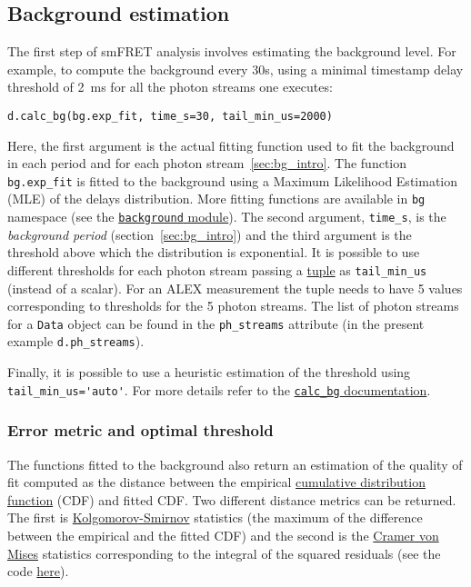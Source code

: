 \subsection{Background estimation}
\label{sec:bg_calc}

The first step of smFRET analysis involves estimating the background level. 
For example, to compute the background every 30s, using a minimal timestamp 
delay threshold of 2~ms for all the photon streams one executes: 

\begin{verbatim}
d.calc_bg(bg.exp_fit, time_s=30, tail_min_us=2000)
\end{verbatim}

Here, the first argument is the actual fitting function used to fit the
background in each period and for each photon stream~\ref{sec:bg_intro}. The function 
\verb|bg.exp_fit| is fitted to the background using a Maximum Likelihood Estimation 
(MLE) of the delays distribution. More fitting functions are available in 
\verb|bg| namespace (see the 
\href{http://fretbursts.readthedocs.org/en/latest/background.html}
{\texttt{background} module}). The second argument, \verb|time_s|, is the 
\textit{background period} (section~\ref{sec:bg_intro}) and the third argument 
is the threshold above which the distribution is exponential. 
It is possible to use different thresholds 
for each photon stream passing a 
\href{https://docs.python.org/2/tutorial/datastructures.html#tuples-and-sequences}{tuple} 
as \verb|tail_min_us| (instead of a scalar). 
For an ALEX measurement the tuple needs to have 5 values 
corresponding to thresholds for the 5 photon streams. The list of photon 
streams for a \verb|Data| object can be found in the \verb|ph_streams| 
attribute (in the present example \verb|d.ph_streams|). 

Finally, it is possible to use a heuristic estimation of the threshold using 
\verb|tail_min_us='auto'|. For more details refer to the 
\href{http://fretbursts.readthedocs.org/en/latest/data\_class.html#fretbursts.burstlib.Data.calc\_bg}{\texttt{calc\_bg} documentation}.

\subsubsection{Error metric and optimal threshold}

The functions fitted to the background also return an estimation of the 
quality of fit computed as the distance between the empirical 
\href{http://en.wikipedia.org/wiki/Cumulative\_distribution\_function}{cumulative distribution function} 
(CDF) and fitted CDF. Two different distance metrics can be returned. 
The first is  
\href{http://en.wikipedia.org/wiki/Kolmogorov\%E2\%80\%93Smirnov\_test}{Kolgomorov-Smirnov} 
statistics (the maximum of the difference between the empirical and the 
fitted CDF) and the second is the 
\href{http://en.wikipedia.org/wiki/Cram\%C3\%A9r\%E2\%80\%93von\_Mises\_criterion}{Cramer von Mises}
statistics corresponding to the integral of the squared residuals 
(see the code 
\href{https://github.com/tritemio/FRETBursts/blob/master/fretbursts/background.py#L40}{here}).

